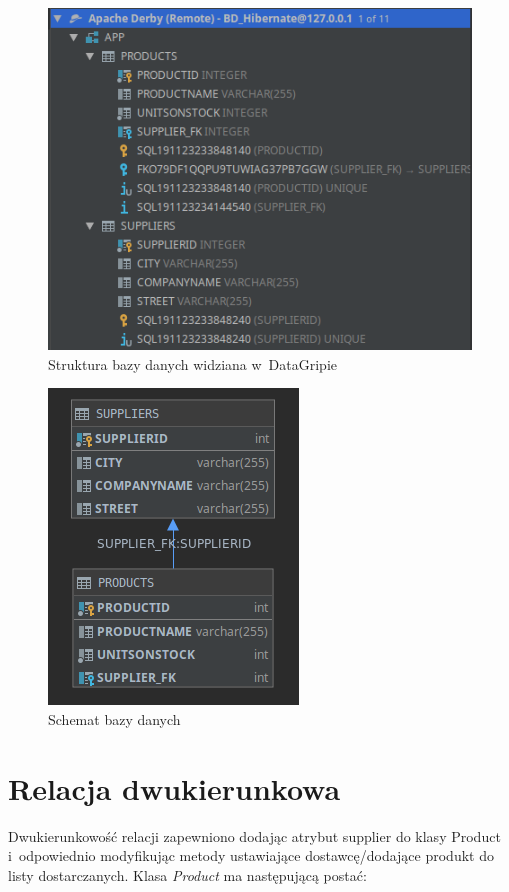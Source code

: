 \documentclass[12pt, a4paper]{mwart}
\begin{document}
\begin{figure}[ht]
  \centering
  \includegraphics[scale=0.5]{IV/4-9.png}
  \caption{Struktura bazy danych widziana w~DataGripie}
  \label{rys:4.9}
\end{figure}

\begin{figure}[ht]
  \centering
  \includegraphics[scale=0.5]{IV/4-10.png}
  \caption{Schemat bazy danych}
  \label{rys:4.10}
\end{figure}

\clearpage
\section{Relacja dwukierunkowa}

Dwukierunkowość relacji zapewniono dodając atrybut supplier do klasy Product i~odpowiednio modyfikując metody ustawiające dostawcę/dodające produkt do listy dostarczanych. Klasa \textit{Product} ma następującą postać:
\end{document}

